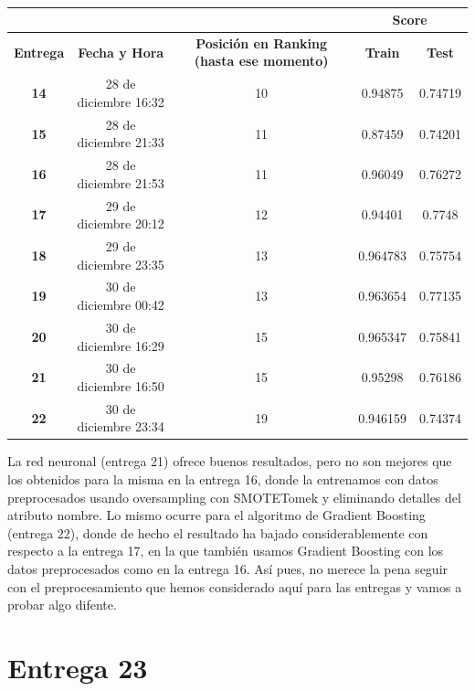 \documentclass[a4paper,11pt]{article}
\begin{document}
  \begin{table}[htbp]
  	\caption{}\begin{center}
  	\begin{tabular}{|c|c|c|c|c|}
  		\hline
  		\multicolumn{1}{|l|}{\textbf{}} & \textbf{} & \textbf{} & \multicolumn{ 2}{c|}{\textbf{Score}} \\ \hline
  		\textbf{Entrega} & \textbf{Fecha y Hora} & \textbf{Posición en Ranking (hasta ese momento)} & \textbf{Train} & \textbf{Test} \\ \hline
  		\textbf{14} & 28 de diciembre 16:32  & 10 & 0.94875 & 0.74719 \\ \hline
  		\textbf{15} & 28 de diciembre 21:33  & 11 & 0.87459 & 0.74201 \\ \hline
  		\textbf{16} & 28 de diciembre 21:53 & 11 & 0.96049 & 0.76272 \\ \hline
  		\textbf{17} & 29 de diciembre 20:12 & 12 & 0.94401 & 0.7748 \\ \hline
  		\textbf{18} & 29 de diciembre 23:35  & 13 & 0.964783 & 0.75754 \\ \hline
  		\textbf{19} & 30 de diciembre 00:42  & 13 & 0.963654 & 0.77135 \\ \hline
  		\textbf{20} & 30 de diciembre 16:29  & 15 & 0.965347 & 0.75841 \\ \hline
  		\textbf{21} & 30 de diciembre 16:50 & 15 & 0.95298 & 0.76186 \\ \hline
  		\textbf{22} & 30 de diciembre 23:34 & 19 & 0.946159 & 0.74374 \\ \hline
  	\end{tabular}\end{center}
  	\label{}
  \end{table}

La red neuronal (entrega 21) ofrece buenos resultados, pero no son mejores que los obtenidos para la misma en la entrega 16, donde la entrenamos con datos preprocesados usando oversampling con SMOTETomek y eliminando detalles del atributo nombre. Lo mismo ocurre para el algoritmo de Gradient Boosting (entrega 22), donde de hecho el resultado ha bajado considerablemente con respecto a la entrega 17, en la que también usamos Gradient Boosting con los datos preprocesados como en la entrega 16. Así pues, no merece la pena seguir con el preprocesamiento que hemos considerado aquí para las entregas y vamos a probar algo difente. 
  
  
\section{Entrega 23}
\end{document}
